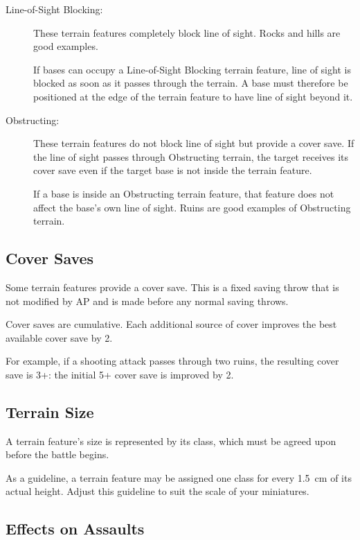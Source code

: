 \begin{description}
    \item[Line-of-Sight Blocking:] These terrain features completely block line of sight. Rocks and hills are good examples.

    If bases can occupy a Line-of-Sight Blocking terrain feature, line of sight is blocked as soon as it passes through the terrain. A base must therefore be positioned at the edge of the terrain feature to have line of sight beyond it.

    \item[Obstructing:] These terrain features do not block line of sight but provide a cover save. If the line of sight passes through Obstructing terrain, the target receives its cover save even if the target base is not inside the terrain feature.

    If a base is inside an Obstructing terrain feature, that feature does not affect the base's own line of sight. Ruins are good examples of Obstructing terrain.
\end{description}

\subsection{Cover Saves}

Some terrain features provide a cover save. This is a fixed saving throw that is not modified by AP and is made before any normal saving throws.

Cover saves are cumulative. Each additional source of cover improves the best available cover save by 2.

For example, if a shooting attack passes through two ruins, the resulting cover save is 3+: the initial 5+ cover save is improved by 2.

\subsection{Terrain Size}
A terrain feature's size is represented by its class, which must be agreed upon before the battle begins.

As a guideline, a terrain feature may be assigned one class for every 1.5~cm of its actual height. Adjust this guideline to suit the scale of your miniatures.

\subsection{Effects on Assaults}

